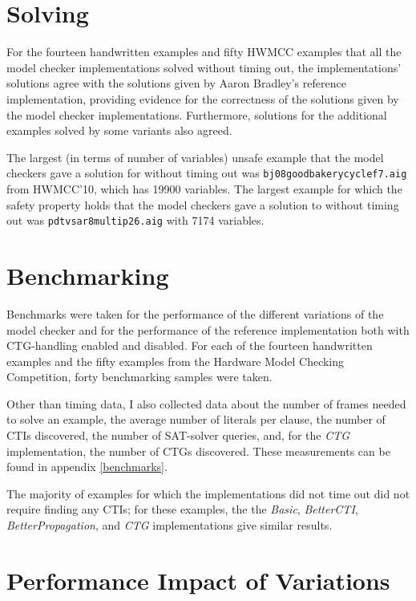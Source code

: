 \documentclass[12pt,a4paper,twoside,openright]{report}
\begin{document}
{\section{Solving}

For the fourteen handwritten examples and fifty HWMCC examples that
all the model checker implementations solved without timing out, the
implementations' solutions agree with the solutions given by Aaron Bradley's reference
implementation, providing evidence for the correctness of the solutions given by the model checker
implementations. Furthermore, solutions for the additional examples solved by some variants
also agreed.

The largest (in terms of number of variables) unsafe example that the model checkers gave a solution
for without timing out was \verb,bj08goodbakerycyclef7.aig, from HWMCC'10, which has 19900 variables.
The largest example for which the safety property holds that the model checkers gave a solution
to without timing out was \verb,pdtvsar8multip26.aig, with 7174 variables.

\section{Benchmarking}
Benchmarks were taken for the performance of the different variations of the model checker and for the
performance of the reference implementation both with CTG-handling enabled and disabled. For each of the fourteen handwritten examples and the fifty examples from the Hardware Model Checking Competition, forty benchmarking samples were taken.

Other than timing data, I also collected data about the number of frames needed to solve an example,
the average number of literals per clause, the number of CTIs discovered, the number of SAT-solver queries,
and, for the \emph{CTG} implementation, the number of CTGs discovered. These measurements can be found in
appendix \ref{benchmarks}.

The majority of examples for which the implementations did not time out did not require finding any
CTIs; for these examples, the the {\it Basic}, {\it BetterCTI}, {\it BetterPropagation},
and {\it CTG} implementations give similar results. 

\section{Performance Impact of Variations}

}
\end{document}
